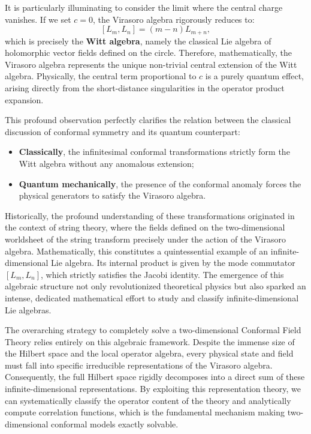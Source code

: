 It is particularly illuminating to consider the limit where the central charge vanishes. If we set \(c = 0\), the Virasoro algebra rigorously reduces to:
\[
    [L_m, L_n] = (m-n)L_{m+n},
\]
which is precisely the \textbf{Witt algebra}, namely the classical Lie algebra of holomorphic vector fields defined on the circle.
Therefore, mathematically, the Virasoro algebra represents the unique non-trivial central extension of the Witt algebra. Physically, the central term proportional to \(c\) is a purely quantum effect, arising directly from the short-distance singularities in the operator product expansion.

This profound observation perfectly clarifies the relation between the classical discussion of conformal symmetry and its quantum counterpart:
\begin{itemize}
    \item \textbf{Classically}, the infinitesimal conformal transformations strictly form the Witt algebra without any anomalous extension;
    \item \textbf{Quantum mechanically}, the presence of the conformal anomaly forces the physical generators to satisfy the Virasoro algebra.
\end{itemize}

Historically, the profound understanding of these transformations originated in the context of string theory, where the fields defined on the two-dimensional worldsheet of the string transform precisely under the action of the Virasoro algebra. Mathematically, this constitutes a quintessential example of an infinite-dimensional Lie algebra. Its internal product is given by the mode commutator \([L_m, L_n]\), which strictly satisfies the Jacobi identity. The emergence of this algebraic structure not only revolutionized theoretical physics but also sparked an intense, dedicated mathematical effort to study and classify infinite-dimensional Lie algebras.

The overarching strategy to completely solve a two-dimensional Conformal Field Theory relies entirely on this algebraic framework. Despite the immense size of the Hilbert space and the local operator algebra, every physical state and field must fall into specific irreducible representations of the Virasoro algebra. Consequently, the full Hilbert space rigidly decomposes into a direct sum of these infinite-dimensional representations. By exploiting this representation theory, we can systematically classify the operator content of the theory and analytically compute correlation functions, which is the fundamental mechanism making two-dimensional conformal models exactly solvable.

